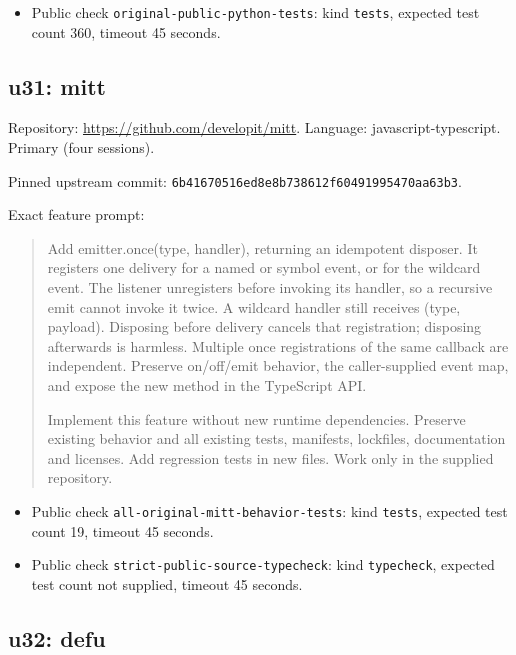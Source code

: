 \documentclass[manuscript,screen,nonacm]{acmart}
\providecommand{\tightlist}{\setlength{\itemsep}{0pt}\setlength{\parskip}{0pt}}
\begin{document}
\begin{itemize}
\tightlist
\item
  Public check \nolinkurl{original-public-python-tests}: kind
  \texttt{tests}, expected test count 360, timeout 45 seconds.
\end{itemize}

\subsection{u31: mitt}\label{u31-mitt}

Repository: \url{https://github.com/developit/mitt}. Language:
javascript-typescript. Primary (four sessions).

Pinned upstream commit:
\nolinkurl{6b41670516ed8e8b738612f60491995470aa63b3}.

Exact feature prompt:

\begin{quote}
Add emitter.once(type, handler), returning an idempotent disposer. It
registers one delivery for a named or symbol event, or for the wildcard
event. The listener unregisters before invoking its handler, so a
recursive emit cannot invoke it twice. A wildcard handler still receives
(type, payload). Disposing before delivery cancels that registration;
disposing afterwards is harmless. Multiple once registrations of the
same callback are independent. Preserve on/off/emit behavior, the
caller-supplied event map, and expose the new method in the TypeScript
API.

Implement this feature without new runtime dependencies. Preserve
existing behavior and all existing tests, manifests, lockfiles,
documentation and licenses. Add regression tests in new files. Work only
in the supplied repository.
\end{quote}

\begin{itemize}
\tightlist
\item
  Public check \nolinkurl{all-original-mitt-behavior-tests}: kind
  \texttt{tests}, expected test count 19, timeout 45 seconds.
\item
  Public check \nolinkurl{strict-public-source-typecheck}: kind
  \texttt{typecheck}, expected test count not supplied, timeout 45
  seconds.
\end{itemize}

\subsection{u32: defu}\label{u32-defu}
\end{document}
